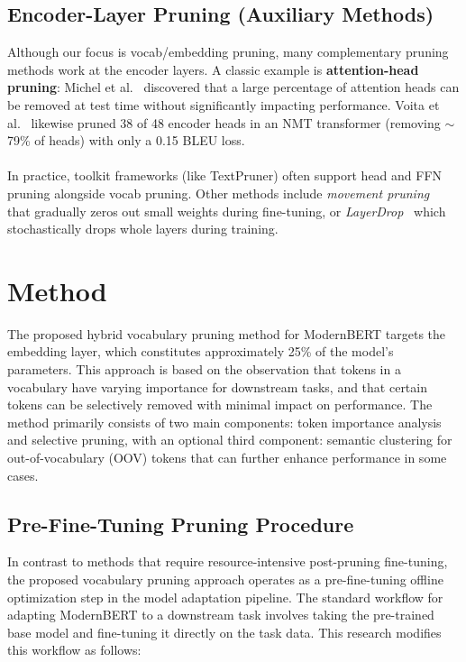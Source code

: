 \documentclass[twocolumn]{article}
\begin{document}
\subsection{Encoder-Layer Pruning (Auxiliary Methods)}

Although our focus is vocab/embedding pruning, many complementary pruning methods work at the encoder layers. A classic example is \textbf{attention-head pruning}: Michel et al.~\cite{michel2019sixteen} discovered that a large percentage of attention heads can be removed at test time without significantly impacting performance. Voita et al.~\cite{voita2019analyzing} likewise pruned 38 of 48 encoder heads in an NMT transformer (removing $\sim$79\% of heads) with only a 0.15 BLEU loss.
\\ \\
In practice, toolkit frameworks (like TextPruner) often support head and FFN pruning alongside vocab pruning. Other methods include \textit{movement pruning}~\cite{sanh2020movement} that gradually zeros out small weights during fine-tuning, or \textit{LayerDrop}~\cite{fan2020layerdrop} which stochastically drops whole layers during training.

\section{Method}

The proposed hybrid vocabulary pruning method for ModernBERT targets the embedding layer, which constitutes approximately 25\% of the model's parameters. This approach is based on the observation that tokens in a vocabulary have varying importance for downstream tasks, and that certain tokens can be selectively removed with minimal impact on performance. The method primarily consists of two main components: token importance analysis and selective pruning, with an optional third component: semantic clustering for out-of-vocabulary (OOV) tokens that can further enhance performance in some cases.

\subsection{Pre-Fine-Tuning Pruning Procedure}
In contrast to methods that require resource-intensive post-pruning fine-tuning, the proposed vocabulary pruning approach operates as a pre-fine-tuning offline optimization step in the model adaptation pipeline. The standard workflow for adapting ModernBERT to a downstream task involves taking the pre-trained base model and fine-tuning it directly on the task data. This research modifies this workflow as follows:
\end{document}
